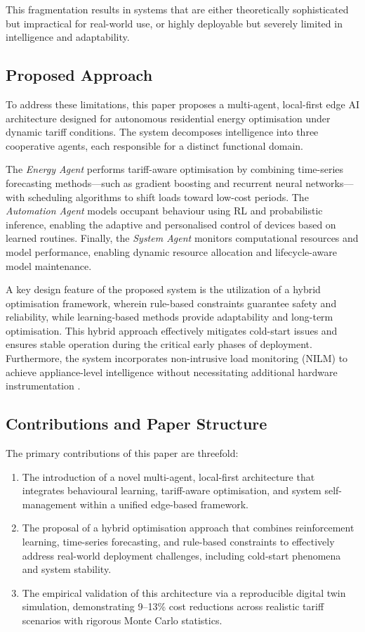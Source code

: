 \documentclass[11pt,a4paper]{article}
\begin{document}
This fragmentation results in systems that are either theoretically sophisticated but impractical for real-world use, or highly deployable but severely limited in intelligence and adaptability.

\subsection{Proposed Approach}
To address these limitations, this paper proposes a multi-agent, local-first edge AI architecture designed for autonomous residential energy optimisation under dynamic tariff conditions. The system decomposes intelligence into three cooperative agents, each responsible for a distinct functional domain.

The \textit{Energy Agent} performs tariff-aware optimisation by combining time-series forecasting methods---such as gradient boosting and recurrent neural networks---with scheduling algorithms to shift loads toward low-cost periods. The \textit{Automation Agent} models occupant behaviour using RL and probabilistic inference, enabling the adaptive and personalised control of devices based on learned routines. Finally, the \textit{System Agent} monitors computational resources and model performance, enabling dynamic resource allocation and lifecycle-aware model maintenance.

A key design feature of the proposed system is the utilization of a hybrid optimisation framework, wherein rule-based constraints guarantee safety and reliability, while learning-based methods provide adaptability and long-term optimisation. This hybrid approach effectively mitigates cold-start issues and ensures stable operation during the critical early phases of deployment. Furthermore, the system incorporates non-intrusive load monitoring (NILM) to achieve appliance-level intelligence without necessitating additional hardware instrumentation \cite{kelly2015neural}.

\subsection{Contributions and Paper Structure}
The primary contributions of this paper are threefold:
\begin{enumerate}[label=\textbf{\arabic*.}]
    \item The introduction of a novel multi-agent, local-first architecture that integrates behavioural learning, tariff-aware optimisation, and system self-management within a unified edge-based framework.
    \item The proposal of a hybrid optimisation approach that combines reinforcement learning, time-series forecasting, and rule-based constraints to effectively address real-world deployment challenges, including cold-start phenomena and system stability.
    \item The empirical validation of this architecture via a reproducible digital twin simulation, demonstrating 9--13\% cost reductions across realistic tariff scenarios with rigorous Monte Carlo statistics.
\end{enumerate}
\end{document}

